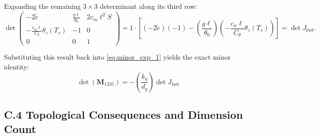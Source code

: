Expanding the remaining $3 \times 3$ determinant along its third row:
\begin{equation}
\det
\begin{pmatrix}
-2\tilde e & \frac{g\ell}{\theta_0} & 2 c_m \ell^2 S \\[6pt]
-\frac{c_w \ell}{C_\theta}\theta_z(T_s) & -1 & 0 \\[6pt]
0 & 0 & 1
\end{pmatrix}
= 1 \cdot \left[ (-2\tilde e)(-1) - \left(\frac{g\ell}{\theta_0}\right)\left(-\frac{c_w \ell}{C_\theta}\theta_z(T_s)\right) \right] = \det J_{\mathrm{fast}}.
\end{equation}

Substituting this result back into \eqref{eq:minor_exp_1} yields the exact minor identity:
\begin{equation}
\boxed{
\det(\mathbf{M}_{1235}) = -\left(\frac{k_g}{d_g}\right) \det J_{\mathrm{fast}}
}
\label{eq:minor_identity}
\end{equation}

\subsection*{C.4 Topological Consequences and Dimension Count}

